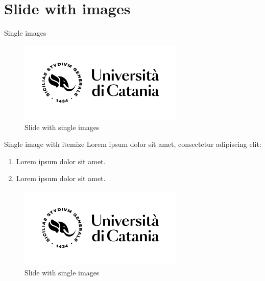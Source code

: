 
\section{Slide with images}

\begin{frame}{Single images}
   \begin{figure}[h]
       \centering
       \includegraphics[width=0.7\textwidth]{img/logo_v2.png}
       \caption{Slide with single images}
       \label{fig:sing_image}
   \end{figure}
\end{frame}


\begin{frame}{Single image with itemize}
     Lorem ipsum dolor sit amet, consectetur adipiscing elit:
    \begin{enumerate}
        \item Lorem ipsum dolor sit amet.
        \item Lorem ipsum dolor sit amet.
    \end{enumerate}
    
   \begin{figure}[h]
       \centering
       \includegraphics[width=0.7\textwidth]{img/logo_v2.png}
       \caption{Slide with single images}
       \label{fig:sing_image}
   \end{figure}
\end{frame}

